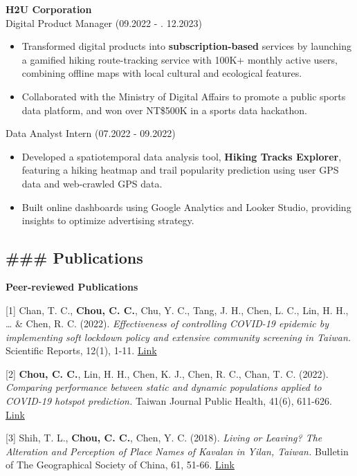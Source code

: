 \textbf{H2U Corporation}\\
Digital Product Manager (09.2022 - . 12.2023)

\begin{itemize}
\item
  Transformed digital products into \textbf{subscription-based} services
  by launching a gamified hiking route-tracking service with 100K+
  monthly active users, combining offline maps with local cultural and
  ecological features.
\item
  Collaborated with the Ministry of Digital Affairs to promote a public
  sports data platform, and won over NT\$500K in a sports data
  hackathon.
\end{itemize}

Data Analyst Intern (07.2022 - 09.2022)

\begin{itemize}
\item
  Developed a spatiotemporal data analysis tool, \textbf{Hiking Tracks
  Explorer}, featuring a hiking heatmap and trail popularity prediction
  using user GPS data and web-crawled GPS data.
\item
  Built online dashboards using Google Analytics and Looker Studio,
  providing insights to optimize advertising strategy.
\end{itemize}

\subsection{\#\#\# Publications}\label{publications}

\textbf{Peer-reviewed Publications}

{[}1{]} Chan, T. C., \textbf{Chou, C. C.}, Chu, Y. C., Tang, J. H.,
Chen, L. C., Lin, H. H., \ldots{} \& Chen, R. C. (2022).
\emph{Effectiveness of controlling COVID-19 epidemic by implementing
soft lockdown policy and extensive community screening in Taiwan.}
Scientific Reports, 12(1), 1-11.
\href{https://www.nature.com/articles/s41598-022-16011-x}{Link}

{[}2{]} \textbf{Chou, C. C.}, Lin, H. H., Chen, K. J., Chen, R. C.,
Chan, T. C. (2022). \emph{Comparing performance between static and
dynamic populations applied to COVID-19 hotspot prediction.} Taiwan
Journal Public Health, 41(6), 611-626.
\href{http://doi.org/10.6288/TJPH.202212_41(6).111074}{Link}

{[}3{]} Shih, T. L., \textbf{Chou, C. C.}, Chen, Y. C. (2018).
\emph{Living or Leaving? The Alteration and Perception of Place Names of
Kavalan in Yilan, Taiwan.} Bulletin of The Geographical Society of
China, 61, 51-66. \href{https://bit.ly/3JTOtxO}{Link}

